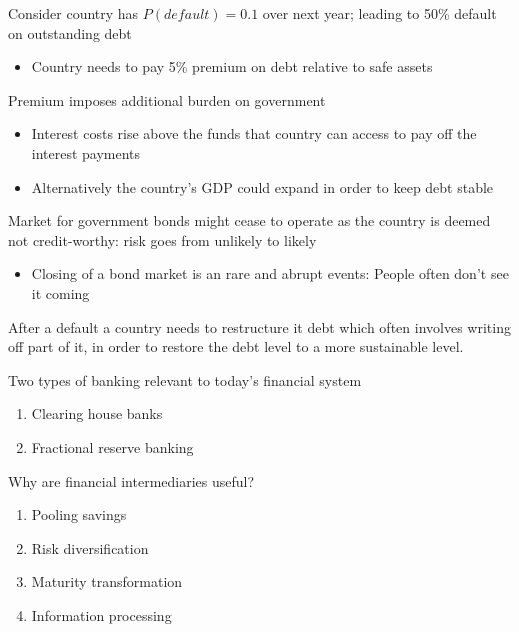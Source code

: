 \documentclass{beamer}
\begin{document}
\begin{frame}
  Consider country has $P(default)=0.1$ over next year; leading to 50\% default on outstanding debt
  \begin{itemize}
    \item Country needs to pay 5\% premium on debt relative to safe assets
  \end{itemize}
  \medskip
  Premium imposes additional burden on government
  \begin{itemize}
    \item Interest costs rise above the funds that country can access to pay off the interest payments
    \item Alternatively the country's GDP could expand in order to keep debt stable
  \end{itemize}
  Market for government bonds might cease to operate as the country is deemed not credit-worthy: risk goes from unlikely to likely
  \begin{itemize}
    \item Closing of a bond market is an rare and abrupt events: People often don't see it coming
  \end{itemize}
  After a default a country needs to restructure it debt which often involves writing off part of it, in order to restore the debt level to a more sustainable level. 
\end{frame}

\begin{frame}
 Two types of banking relevant to today's financial system
\begin{enumerate}
  \item Clearing house banks
  \item Fractional reserve banking
\end{enumerate}
\end{frame}

\begin{frame}
 Why are financial intermediaries useful?
\begin{enumerate}
  \item Pooling savings  
  \item Risk diversification
  \item Maturity transformation
  \item Information processing  
\end{enumerate}
\end{frame}
\end{document}
